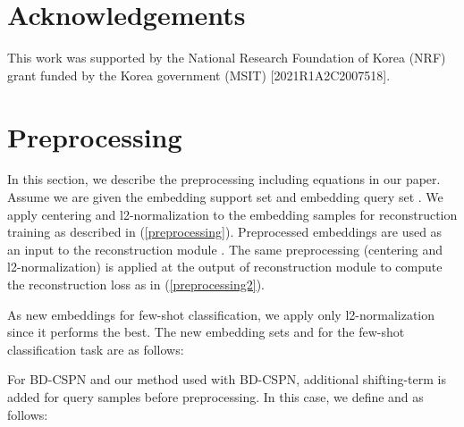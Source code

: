 \documentclass{article}
\begin{document}
\section*{Acknowledgements}
This work was supported by the National Research Foundation of Korea (NRF) grant funded by the Korea government (MSIT) [2021R1A2C2007518].





\renewcommand\thesection{\Alph{section}}
\onecolumn
\setcounter{section}{0}

\section{Preprocessing}
In this section, we describe the preprocessing including equations in our paper.
Assume we are given the embedding support set  and embedding query set .
We apply centering and l2-normalization to the embedding samples for reconstruction training as described in (\ref{preprocessing}).
Preprocessed embeddings  are used as an input to the reconstruction module .
The same preprocessing (centering and l2-normalization) is applied at the output of reconstruction module to compute the reconstruction loss  as in (\ref{preprocessing2}).


As new embeddings for few-shot classification, we apply only l2-normalization since it performs the best.
The new embedding sets  and  for the few-shot classification task are as follows:


For BD-CSPN \cite{BDCSPN} and our method used with BD-CSPN, additional shifting-term is added for query samples before preprocessing.
In this case, we define  and  as follows:


\newpage
\end{document}
